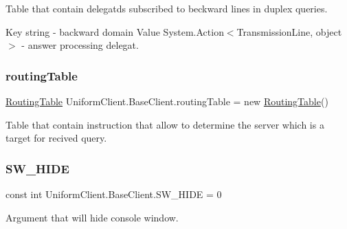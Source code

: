 Table that contain delegatds subscribed to beckward lines in duplex queries. 

Key string -\/ backward domain Value System.\+Action$<$\+Transmission\+Line, object$>$ -\/ answer processing delegat. \mbox{\label{class_uniform_client_1_1_base_client_a33b34ea9a2d7b4b8e26af767ab2897cf}} 
\subsubsection{\texorpdfstring{routing\+Table}{routingTable}}
{\footnotesize\ttfamily \mbox{\hyperlink{class_pipes_provider_1_1_networking_1_1_routing_1_1_routing_table}{Routing\+Table}} Uniform\+Client.\+Base\+Client.\+routing\+Table = new \mbox{\hyperlink{class_pipes_provider_1_1_networking_1_1_routing_1_1_routing_table}{Routing\+Table}}()\hspace{0.3cm}{\ttfamily [static]}}



Table that contain instruction that allow to determine the server which is a target for recived query. 

\mbox{\label{class_uniform_client_1_1_base_client_a6060f2eb1d44ec518f2dfc99c8b4f7aa}} 
\subsubsection{\texorpdfstring{S\+W\+\_\+\+H\+I\+DE}{SW\_HIDE}}
{\footnotesize\ttfamily const int Uniform\+Client.\+Base\+Client.\+S\+W\+\_\+\+H\+I\+DE = 0\hspace{0.3cm}{\ttfamily [protected]}}



Argument that will hide console window. 

\mbox{\label{class_uniform_client_1_1_base_client_a7545b9c72eef6cb7594a7001d3f558e4}} 
